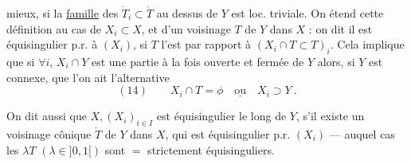 mieux, si la \uline{famille} des $\dot T_i\subset\dot T$ au dessus
de $Y$ est  loc. triviale. On étend cette
définition au cas de $X_i\subset X$, et d'un
voisinage  $T$ de $Y$ dans $X$ : on dit
il est équisingulier p.r. à $(X_i)$, si $T$
l'est par rapport à $(X_i\cap T\subset T)_i$. Cela
implique que si $\forall i$, $X_i\cap Y$ est une
partie à la fois ouverte et fermée de $Y$
alors, si $Y$ est connexe, que  l'on ait
l'alternative
\[
(14)\qquad X_i\cap T=\phi\quad\underline{\text{ou}}\quad X_i\supset Y\ .
\]
\margin{Si $T$ équisingulier p.r. à $(X_i)$,
$\lambda T$ l'est strictement pour $\lambda\in]0,1[$.}

On dit aussi que $X,(X_i)_{i\in I}$ est
 équisingulier
le long de $Y$, s'il existe un voisinage cônique
 $\dot T$ de $Y$ dans $X$, qui est équisingulier
p.r.  $(X_i)$ --- auquel cas les $\lambda T$
$(\lambda\in]0,1[)$ sont $=$ strictement équisinguliers.
